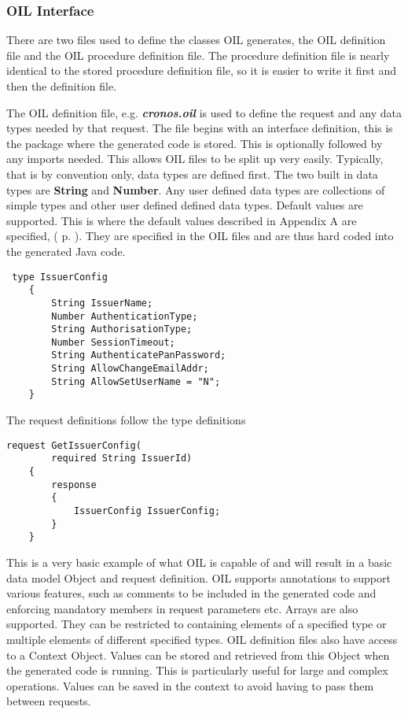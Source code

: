 \documentclass[a4paper, 11pt, titlepage]{article}
\begin{document}
\subsubsection{OIL Interface} 
There are two files used to define the classes OIL generates, the OIL definition file and the OIL procedure definition file. The procedure definition file is nearly identical to the stored procedure definition file, so it is easier to write it first and then the definition file. 
 
The OIL definition file, e.g. \textbf{\textit{cronos.oil}} is used to define the request and any data types needed by that request. The file begins with an interface definition, this is the package where the generated code is stored. This is optionally followed by any imports needed. This allows OIL files to be split up very easily. Typically, that is by convention only, data types are defined first. The two built in data types are \textbf{String} and \textbf{Number}. Any user defined data types are collections of simple types and other user defined defined data types. Default values are supported. This is where the default values described in Appendix A are specified, ( p. \pageref{default_retail_values} ). They are specified in the OIL files and are thus hard coded into the generated Java code. 
\begin{verbatim} 
 type IssuerConfig 
    { 
        String IssuerName; 
        Number AuthenticationType; 
        String AuthorisationType; 
        Number SessionTimeout; 
        String AuthenticatePanPassword; 
        String AllowChangeEmailAddr; 
        String AllowSetUserName = "N"; 
    } 
\end{verbatim} 
The request definitions follow the type definitions 
\begin{verbatim} 
request GetIssuerConfig( 
        required String IssuerId) 
    { 
        response 
        { 
            IssuerConfig IssuerConfig; 
        } 
    } 
\end{verbatim} 
This is a very basic example of what OIL is capable of and will result in a basic data model Object and request definition. OIL supports annotations to support various features, such as comments to be included in the generated code and enforcing mandatory members in request parameters etc. Arrays are also supported. They can be restricted to containing elements of a specified type or multiple elements of different specified types. OIL definition files also have access to a Context Object. Values can be stored and retrieved from this Object when the generated code is running. This is particularly useful for large and complex operations. Values can be saved in the context to avoid having to pass them between requests. 
 
\end{document}
